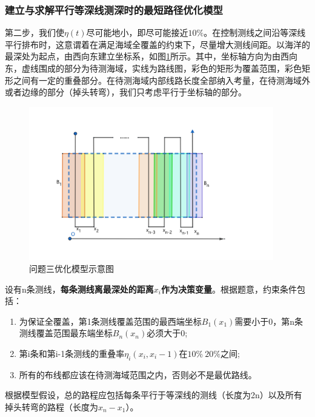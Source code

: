 \documentclass{article}
\begin{document}
\subsubsection{建立与求解平行等深线测深时的最短路径优化模型}
	\par 第二步，我们使$\eta(t)$尽可能地小，即尽可能接近$10\%$。在控制测线之间沿等深线平行排布时，这意谓着在满足海域全覆盖的约束下，尽量增大测线间距。以海洋的最深处为起点，由西向东建立坐标系，如图\ref{pro3Geo}所示。其中，坐标轴方向为由西向东，虚线围成的部分为待测海域，实线为路线图，彩色的矩形为覆盖范围，彩色矩形之间有一定的重叠部分。在待测海域内部线路长度全部纳入考量，在待测海域外或者边缘的部分（掉头转弯），我们只考虑平行于坐标轴的部分。
	\begin{figure}[H]
		\centering  %
		\includegraphics[width=0.95\textwidth]{问题三//优化示意图}
		\caption{问题三优化模型示意图}
		\label{pro3Geo}
	\end{figure}
	设有n条测线，\textbf{每条测线离最深处的距离$x_i$作为决策变量}。根据题意，约束条件包括：
	\begin{enumerate}
		\item 为保证全覆盖，第1条测线覆盖范围的最西端坐标$B_1(x_1)$需要小于0，第n条测线覆盖范围最东端坐标$B_n(x_n)$必须大于0;
		\item 第i条和第i-1条测线的重叠率$\eta_i(x_i,x_i-1)$在$10\%~20\%$之间;
		\item 所有的布线都应该在待测海域范围之内，否则必不是最优路线。
	\end{enumerate}
	根据模型假设，总的路程应包括每条平行于等深线的测线（长度为2n）以及所有掉头转弯的路程（长度为$x_n-x_1$）。
	
\end{document}
